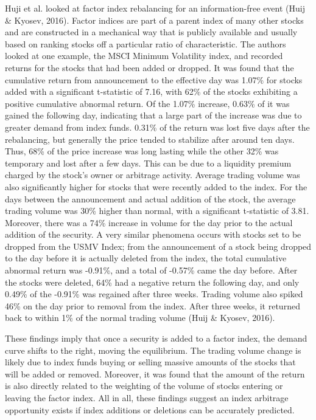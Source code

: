 \documentclass[12pt,twoside]{reedthesis}
\theoremstyle{definition}
\theoremstyle{definition}
\theoremstyle{definition}
\theoremstyle{remark}
\begin{document}
Huji et al. looked at factor index rebalancing for an information-free
event (Huij \& Kyosev, 2016). Factor indices are part of a parent index
of many other stocks and are constructed in a mechanical way that is
publicly available and usually based on ranking stocks off a particular
ratio of characteristic. The authors looked at one example, the MSCI
Minimum Volatility index, and recorded returns for the stocks that had
been added or dropped. It was found that the cumulative return from
announcement to the effective day was 1.07\% for stocks added with a
significant t-statistic of 7.16, with 62\% of the stocks exhibiting a
positive cumulative abnormal return. Of the 1.07\% increase, 0.63\% of
it was gained the following day, indicating that a large part of the
increase was due to greater demand from index funds. 0.31\% of the
return was lost five days after the rebalancing, but generally the price
tended to stabilize after around ten days. Thus, 68\% of the price
increase was long lasting while the other 32\% was temporary and lost
after a few days. This can be due to a liquidity premium charged by the
stock's owner or arbitrage activity. Average trading volume was also
significantly higher for stocks that were recently added to the index.
For the days between the announcement and actual addition of the stock,
the average trading volume was 30\% higher than normal, with a
significant t-statistic of 3.81. Moreover, there was a 74\% increase in
volume for the day prior to the actual addition of the security. A very
similar phenomena occurs with stocks set to be dropped from the USMV
Index; from the announcement of a stock being dropped to the day before
it is actually deleted from the index, the total cumulative abnormal
return was -0.91\%, and a total of -0.57\% came the day before. After
the stocks were deleted, 64\% had a negative return the following day,
and only 0.49\% of the -0.91\% was regained after three weeks. Trading
volume also spiked 46\% on the day prior to removal from the index.
After three weeks, it returned back to within 1\% of the normal trading
volume (Huij \& Kyosev, 2016).

These findings imply that once a security is added to a factor index,
the demand curve shifts to the right, moving the equilibrium. The
trading volume change is likely due to index funds buying or selling
massive amounts of the stocks that will be added or removed. Moreover,
it was found that the amount of the return is also directly related to
the weighting of the volume of stocks entering or leaving the factor
index. All in all, these findings suggest an index arbitrage opportunity
exists if index additions or deletions can be accurately predicted.
\end{document}
